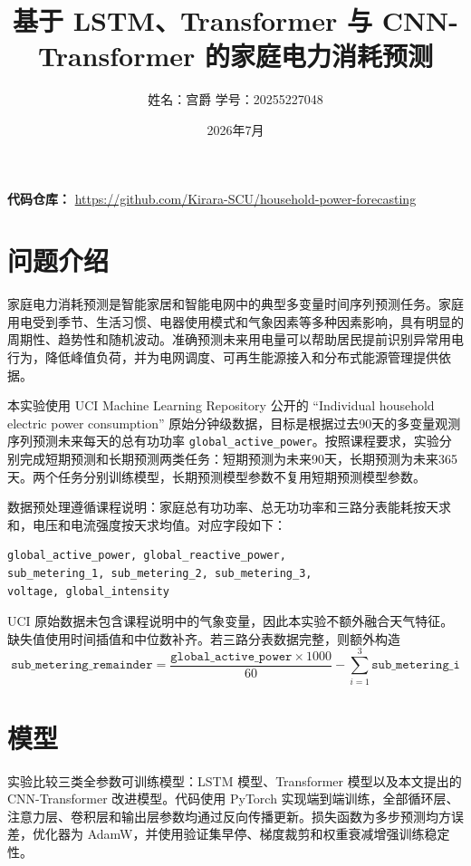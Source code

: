 \documentclass[UTF8,a4paper,12pt]{ctexart}
\title{基于 LSTM、Transformer 与 CNN-Transformer 的家庭电力消耗预测}
\author{姓名：宫爵 \quad 学号：20255227048\\}
\date{2026年7月}
\begin{document}
\maketitle

\noindent\textbf{代码仓库：}
\href{https://github.com/Kirara-SCU/household-power-forecasting}{https://github.com/Kirara-SCU/household-power-forecasting}

\section{问题介绍}

家庭电力消耗预测是智能家居和智能电网中的典型多变量时间序列预测任务。家庭用电受到季节、生活习惯、电器使用模式和气象因素等多种因素影响，具有明显的周期性、趋势性和随机波动。准确预测未来用电量可以帮助居民提前识别异常用电行为，降低峰值负荷，并为电网调度、可再生能源接入和分布式能源管理提供依据。

本实验使用 UCI Machine Learning Repository 公开的 ``Individual household electric power consumption'' 原始分钟级数据，目标是根据过去90天的多变量观测序列预测未来每天的总有功功率 \texttt{global\_active\_power}。按照课程要求，实验分别完成短期预测和长期预测两类任务：短期预测为未来90天，长期预测为未来365天。两个任务分别训练模型，长期预测模型参数不复用短期预测模型参数。

数据预处理遵循课程说明：家庭总有功功率、总无功功率和三路分表能耗按天求和，电压和电流强度按天求均值。对应字段如下：

\begin{lstlisting}[basicstyle=\footnotesize\ttfamily,breaklines=true]
global_active_power, global_reactive_power,
sub_metering_1, sub_metering_2, sub_metering_3,
voltage, global_intensity
\end{lstlisting}

UCI 原始数据未包含课程说明中的气象变量，因此本实验不额外融合天气特征。缺失值使用时间插值和中位数补齐。若三路分表数据完整，则额外构造
\[
\texttt{sub\_metering\_remainder}=
\frac{\texttt{global\_active\_power}\times1000}{60}
-\sum_{i=1}^{3}\texttt{sub\_metering\_i}
\]

\section{模型}

实验比较三类全参数可训练模型：LSTM 模型、Transformer 模型以及本文提出的 CNN-Transformer 改进模型。代码使用 PyTorch 实现端到端训练，全部循环层、注意力层、卷积层和输出层参数均通过反向传播更新。损失函数为多步预测均方误差，优化器为 AdamW，并使用验证集早停、梯度裁剪和权重衰减增强训练稳定性。
\end{document}
